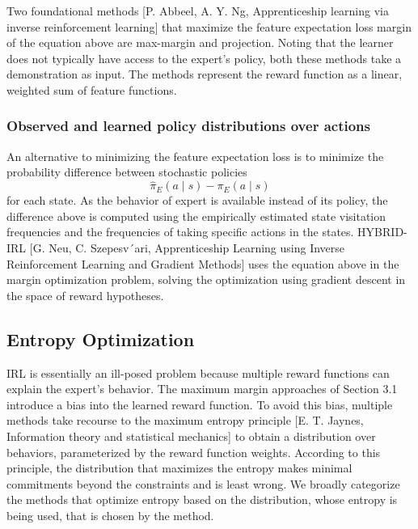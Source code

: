 \documentclass[11pt]{article}
\begin{document}
Two foundational methods [P. Abbeel, A. Y. Ng, Apprenticeship learning via inverse reinforcement learning] that maximize the feature expectation loss
margin of the equation above are max-margin and projection. Noting that the learner does not typically have access to the expert’s policy, both these methods take a demonstration as input. The methods represent the reward function as a linear, weighted sum of feature functions.

\subsubsection{Observed and learned policy distributions over actions}
An alternative to minimizing the feature expectation loss is to minimize the probability difference between stochastic policies
$$\hat{\pi}_{E} (a \mid s) - \pi_{E} (a \mid s)$$
for each state. As the behavior of expert is available instead of its policy, the difference above is computed using the empirically estimated state visitation frequencies and the frequencies of taking specific actions in the states. HYBRID-IRL [G. Neu, C. Szepesv´ari, Apprenticeship Learning using Inverse Reinforcement Learning and Gradient Methods] uses the equation above in the margin optimization problem, solving the optimization using gradient descent in the space of reward hypotheses.

\subsection{Entropy Optimization}
IRL is essentially an ill-posed problem because multiple reward functions can explain the expert’s behavior. The maximum margin approaches of Section 3.1 introduce a bias into the learned reward function. To avoid this bias, multiple methods take recourse to the maximum entropy principle [E. T. Jaynes, Information theory and statistical mechanics] to obtain a distribution over behaviors, parameterized by the reward function weights. According to this principle, the distribution that maximizes the entropy makes minimal commitments beyond the constraints and is least wrong. We broadly categorize the methods that optimize entropy based on the distribution, whose entropy is being used, that is chosen by the method.
\end{document}
